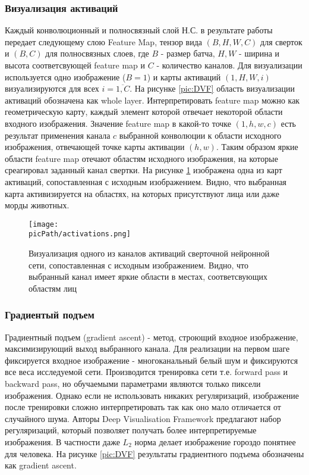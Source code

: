 \documentclass[oneside,final,14pt]{extreport}
\newcommand{\picPath}{img}
\begin{document}
\subsubsection{Визуализация активаций}
Каждый конволюционный и полносвязный слой Н.С. в результате работы передает следующему слою Feature Map, тензор вида $(B,H,W,C)$ для сверток и $(B,C)$ для полносвязных слоев, где $B $  - размер батча, $H, W$ - ширина и высота соответсвующей feature map и  $C$ - количество каналов. Для визуализации используется одно изображение ($B=1$) и карты активаций $(1,H,W,i)$ визуализируются для всех $i = \overline{1,C}$. На рисунке \ref{pic:DVF} область визуализации активаций обозначена как whole layer. Интерпретировать feature map можно как геометрическую карту, каждый элемент которой отвечает некоторой области входного изображения. Значение feature map в какой-то точке $(1,h,w,c)$  есть результат применения канала $c$ выбранной конволюции к области исходного изображения, отвечающей точке карты активации $(h,w)$. Таким образом яркие области feature map отечают областям исходного изображения, на которые среагировал заданный канал свертки. На рисунке \ref{pic:activations} изображена одна из карт активаций, сопоставленная с исходным изображением. Видно, что выбранная карта активизируется на областях, на которых присутствуют лица или даже морды животных.
\begin{figure}[H]
\begin{center}
\texttt{[image: \\picPath/activations.png]}
\end{center}
  \caption{Визуализация одного из каналов активаций сверточной нейронной сети, сопоставленная с исходным изображением. Видно, что выбранный канал имеет яркие области в местах, соответсвующих областям лиц}
  \label{pic:activations}
\end{figure}
\subsubsection{Градиентый подъем}
Градиентный подъем (gradient ascent) \cite{bib:deepviz} - метод, строющий входное изображение, максимизирующий выход выбранного канала. Для реализации на первом шаге фиксируется входное изображение - многоканальный белый шум и фиксируются все веса исследуемой сети. Производится тренировка сети т.е. forward pass и backward pass, но обучаемыми параметрами являются только пиксели изображения. Однако если не использовать никаких регуляризаций, изображение после тренировки сложно интерпретировать так как оно мало отличается от случайного шума. Авторы Deep Visualisation Framework предлагают набор регуляризаций, который позволяет получать более интерпретируемые изображения. В частности даже $L_2$ норма делает изображение гороздо понятнее для человека. На рисунке \ref{pic:DVF} результаты градиентного подъема обозначены как gradient ascent.
\end{document}
